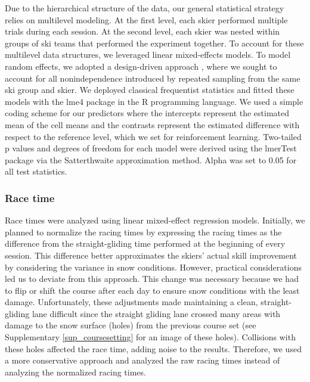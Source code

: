 \documentclass[pdflatex,sn-nature]{sn-jnl}%
\theoremstyle{thmstyleone}%
\theoremstyle{thmstyletwo}%
\theoremstyle{thmstylethree}%
\begin{document}
Due to the hierarchical structure of the data, our general statistical strategy relies on multilevel modeling. At the first level, each skier performed multiple trials during each session. At the second level, each skier was nested within groups of ski teams that performed the experiment together. To account for these multilevel data structures, we leveraged linear mixed-effects models. To model random effects, we adopted a design-driven approach \cite{barr_random_2013, barr_learning_2021}, where we sought to account for all nonindependence introduced by repeated sampling from the same ski group and skier. We deployed classical frequentist statistics and fitted these models with the lme4 package \cite{bates_fitting_2015} in the R \cite{r_core_team_r_2022} programming language. We used a simple coding scheme for our predictors where the intercepts represent the estimated mean of the cell means and the contrasts represent the estimated difference with respect to the reference level, which we set for reinforcement learning. Two-tailed p values and degrees of freedom for each model were derived using the lmerTest package \cite{kuznetsova_lmertest_2017} via the Satterthwaite approximation method. Alpha was set to 0.05 for all test statistics.

\subsubsection{Race time}

Race times were analyzed using linear mixed-effect regression models. Initially, we planned to normalize the racing times by expressing the racing times as the difference from the straight-gliding time performed at the beginning of every session. This difference better approximates the skiers' actual skill improvement by considering the variance in snow conditions. However, practical considerations led us to deviate from this approach. This change was necessary because we had to flip or shift the course after each day to ensure snow conditions with the least damage. Unfortunately, these adjustments made maintaining a clean, straight-gliding lane difficult since the straight gliding lane crossed many areas with damage to the snow surface (holes) from the previous course set (see Supplementary \ref{sup_coursesetting} for an image of these holes). Collisions with these holes affected the race time, adding noise to the results. Therefore, we used a more conservative approach and analyzed the raw racing times instead of analyzing the normalized racing times.
\end{document}
